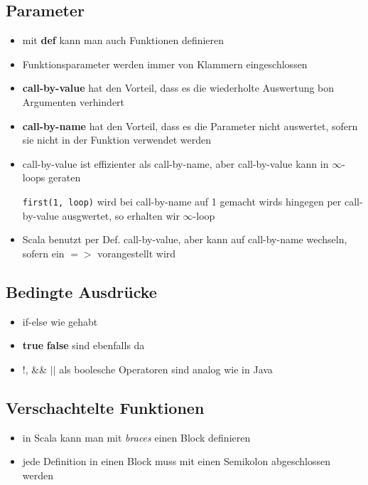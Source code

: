 \subsection{Parameter}
\begin{itemize}
  \item mit \textbf{def} kann man auch Funktionen definieren
  
  
  
  \item Funktionsparameter werden immer von Klammern eingeschlossen
  \item \textbf{call-by-value} hat den Vorteil, dass es die wiederholte
  Auswertung bon Argumenten verhindert
  \item \textbf{call-by-name} hat den Vorteil, dass es die Parameter
  nicht auswertet, sofern sie nicht in der Funktion verwendet werden
  \item call-by-value ist effizienter als call-by-name, aber call-by-value
  kann in $\infty$-loops geraten
  
  
  
  \texttt{first(1, loop)} wird bei call-by-name auf 1 gemacht \und wirds
  hingegen per call-by-value ausgwertet, so erhalten wir $\infty$-loop
  \item Scala benutzt per Def. call-by-value, aber kann auf call-by-name
  wechseln, sofern ein $=>$ vorangestellt wird
  
  
  
\end{itemize}


\subsection{Bedingte Ausdrücke}
\begin{itemize}
  \item if-else wie gehabt
  \item \textbf{true} \und \textbf{false} sind ebenfalls da
  \item !, \&\& $||$ als boolesche Operatoren sind analog wie in Java
\end{itemize}


\subsection{Verschachtelte Funktionen}
\begin{itemize}
  \item in Scala kann man mit \textit{braces} einen Block definieren
  \item jede Definition in einen Block muss mit einen Semikolon abgeschlossen
  werden
\end{itemize}


